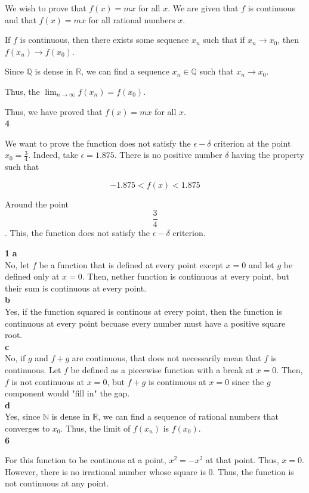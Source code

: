 \documentclass[addpoints]{exam}
\begin{document}
\begin{questions}
We wish to prove that $f(x) = mx$ for all $x$. We are given that $f$ is continuous and 
that $f(x) = mx$ for all rational numbers $x$. 

If $f$ is continuous, then there exists some sequence ${x_n}$  such that 
if $x_n \to x_0$, then $f(x_n) \to f(x_0)$.

Since $\mathbb{Q}$ is dense in $\mathbb{R}$, we can find a sequence ${x_n} \in \mathbb{Q}$ such that
$x_n \to x_0$.

Thus, the $\lim_{n \to \infty} f(x_n) = f(x_0)$. 

Thus, we have proved that $f(x) = mx$ for all $x$.\\

\question \textbf{4}

We want to prove the function does not satisfy the $\epsilon - \delta$ criterion at the point
$x_0 = \frac{3}{4}$. Indeed, take $\epsilon = 1.875$. There is no positive number $\delta$ having
the property such that 

\[-1.875 < f(x) < 1.875\]

Around the point $$\frac{3}{4}$$. This, the function does not satisfy the $\epsilon - \delta$ criterion.

\question \textbf{1} \textbf{a} \\

No, let $f$ be a function that is defined at every point except $x = 0$ and let $g$ be defined only
at $x = 0$. Then, nether function is continuous at every point, but their sum is continuous at every point.\\

\textbf{b} \\

Yes, if the function squared is continous at every point, then the function is continuous at every point 
becuase every number must have a positive square root.\\

\textbf{c} \\

No, if $g$ and $f + g$ are continuous, that does not necessarily mean that $f$ is continuous. Let 
$f$ be defined as a piecewise function with a break at $x = 0$. Then, $f$ is not continuous at $x = 0$,
but $f + g$ is continuous at $x = 0$ since the $g$ component would "fill in" the gap.\\

\textbf{d} \\

Yes, since $\mathbb{N}$ is dense in $\mathbb{R}$, we can find a sequence of rational numbers
that converges to $x_0$. Thus, the limit of $f(x_n)$ is $f(x_0)$.\\

\question \textbf{6}

For this function to be continous at a point, $x^2 = -x^2$ at that point. 
Thus, $x = 0$. However, there is no irrational number whose square is $0$. Thus, the function is not continuous at any point.\\

\end{questions}
\end{document}
